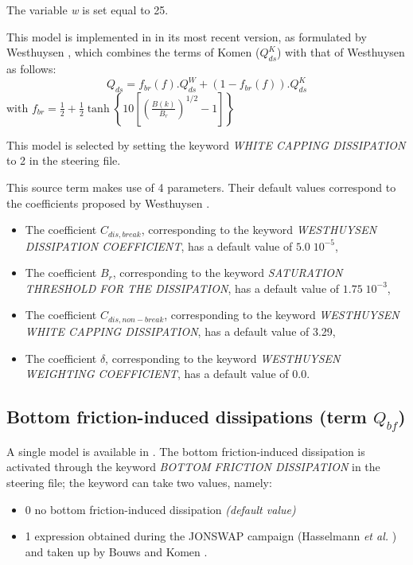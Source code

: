  The variable \textit{w} is set equal to 25.

 This model is implemented in \tomawac in its most recent version, as
 formulated by Westhuysen \cite{Westhuys2008}, which combines the terms of
 Komen \cite{Komen1984} ($Q_{ds}^{K}$) with that of Westhuysen
 \cite{Westhuys2007} as follows:
\begin{equation} \label{GrindEQ__4_41_}
Q_{ds} =f_{br} (f).Q_{ds} ^{W} +\left(1-f_{br} (f)\right).Q_{ds} ^K
\end{equation}
with $f_{br} =\frac{1}{2} +\frac{1}{2} \tanh \left\{10\left[
  \left(\frac{B(k)}{B_{r} } \right)^{1/2} -1\right]\right\}$

This model is selected by setting the keyword \textit{WHITE CAPPING
  DISSIPATION} to 2 in the steering file.\textbf{}

This source term makes use of 4 parameters. Their default values correspond
to the coefficients proposed by Westhuysen  \cite{Westhuys2008}.

\begin{itemize}
\item  The coefficient ${C}_{dis,break}$, corresponding to the keyword
  \textit{WESTHUYSEN  DISSIPATION COEFFICIENT}, has a default value of
  $5.0\; 10^{-5}$,
\item  The coefficient ${B}_{r}$, corresponding to the keyword
  \textit{SATURATION THRESHOLD FOR THE DISSIPATION}, has a default value of
  $1.75\; 10^{-3}$,
\item  The coefficient ${C}_{dis,non-break}$, corresponding to the keyword
  \textit{WESTHUYSEN WHITE CAP\-PING DISSIPATION}, has a default value of 3.29,
\item  The coefficient $\delta$, corresponding to the keyword \textit{WESTHUYSEN
  WEIGHTING COEFFICIENT}, has a default value of 0.0.
\end{itemize}


\subsection{ Bottom friction-induced dissipations (term $Q_{bf}$)}
\label{BOTTOMFRICTION}
A single model is available in \tomawac. The bottom friction-induced
dissipation is activated through the keyword \textit{BOTTOM FRICTION
  DISSIPATION} in the steering file; the keyword can take two values, namely:

 \begin{itemize}
\item 0 no bottom friction-induced dissipation \textit{(default value)}

\item 1 expression obtained during the JONSWAP campaign (Hasselmann
  \textit{et al.} \cite{Hasselmann1973}) and taken up by Bouws and Komen
  \cite{Bouws1983}.
\end{itemize}

